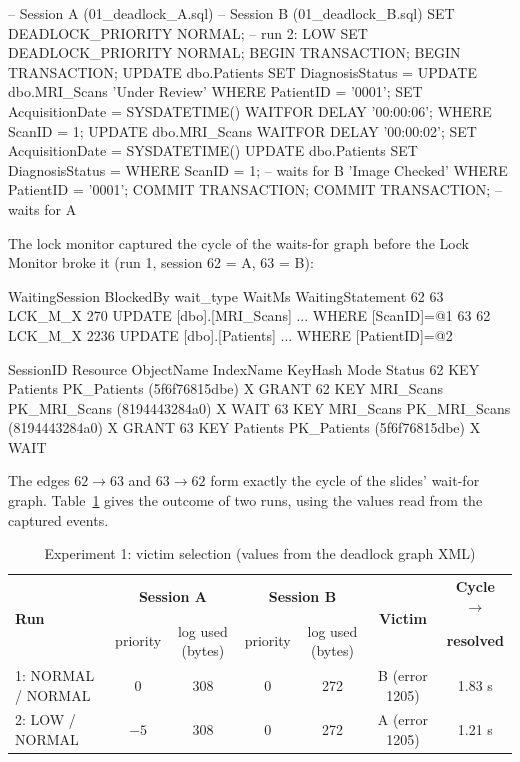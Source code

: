 \begin{SQLCode}
-- Session A (01_deadlock_A.sql)                -- Session B (01_deadlock_B.sql)
SET DEADLOCK_PRIORITY NORMAL;  -- run 2: LOW    SET DEADLOCK_PRIORITY NORMAL;
BEGIN TRANSACTION;                              BEGIN TRANSACTION;
UPDATE dbo.Patients SET DiagnosisStatus =       UPDATE dbo.MRI_Scans
  'Under Review' WHERE PatientID = '0001';        SET AcquisitionDate = SYSDATETIME()
WAITFOR DELAY '00:00:06';                         WHERE ScanID = 1;
UPDATE dbo.MRI_Scans                            WAITFOR DELAY '00:00:02';
  SET AcquisitionDate = SYSDATETIME()           UPDATE dbo.Patients SET DiagnosisStatus =
  WHERE ScanID = 1;          -- waits for B       'Image Checked' WHERE PatientID = '0001';
COMMIT TRANSACTION;                             COMMIT TRANSACTION;  -- waits for A
\end{SQLCode}

The lock monitor captured the cycle of the waits-for graph before the Lock Monitor broke it (run 1, session 62 = A, 63 = B):

\begin{SQLCode}
WaitingSession BlockedBy wait_type WaitMs WaitingStatement
62             63        LCK_M_X   270    UPDATE [dbo].[MRI_Scans] ... WHERE [ScanID]=@1
63             62        LCK_M_X   2236   UPDATE [dbo].[Patients]  ... WHERE [PatientID]=@2

SessionID Resource ObjectName IndexName     KeyHash         Mode Status
62        KEY      Patients   PK_Patients   (5f6f76815dbe)  X    GRANT
62        KEY      MRI_Scans  PK_MRI_Scans  (8194443284a0)  X    WAIT
63        KEY      MRI_Scans  PK_MRI_Scans  (8194443284a0)  X    GRANT
63        KEY      Patients   PK_Patients   (5f6f76815dbe)  X    WAIT
\end{SQLCode}

The edges $62 \rightarrow 63$ and $63 \rightarrow 62$ form exactly the cycle of the slides' wait-for graph. Table~\ref{tab:r5-deadlock} gives the outcome of two runs, using the values read from the captured  events.

\begin{table}[H]
\centering
\caption{Experiment 1: victim selection (values from the deadlock graph XML)}
\label{tab:r5-deadlock}
\small
\begin{tabular}{lcccccc}
\toprule
\multirow{2}{*}{\textbf{Run}} & \multicolumn{2}{c}{\textbf{Session A}} & \multicolumn{2}{c}{\textbf{Session B}} & \multirow{2}{*}{\textbf{Victim}} & \textbf{Cycle $\rightarrow$} \\
 & priority & log used (bytes) & priority & log used (bytes) & & \textbf{resolved} \\
\midrule
1: NORMAL / NORMAL & 0  & 308 & 0 & 272 & B (error 1205) & 1.83 s \\
2: LOW / NORMAL    & $-5$ & 308 & 0 & 272 & A (error 1205) & 1.21 s \\
\bottomrule
\end{tabular}
\end{table}

